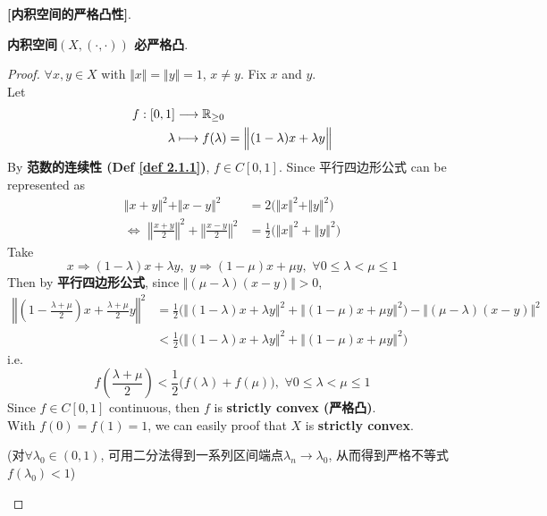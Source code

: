 	\begin{proposition}\label{prop 3.3.1}
		\textbf{[内积空间的严格凸性]}. 
		\begin{center}
			\textbf{内积空间$(X , (\cdot , \cdot))$ 必严格凸}.
		\end{center}
		
		\vspace{4em}
		
		\begin{proof}
			$\forall x , y \in X$ with $\Vert x \Vert = \Vert y \Vert = 1$, $x \neq y$. Fix $x$ and $y$. \\
			Let
			\begin{align}
				f : [0 , 1] &\longrightarrow \mathbb{R}_{\geq 0} \\
				\lambda &\longmapsto f(\lambda) = \Big\Vert (1 - \lambda) x + \lambda y \Big\Vert
			\end{align}
			By \textbf{范数的连续性 (Def \ref{def 2.1.1})}, $f \in C[0 , 1]$. Since 平行四边形公式 can be represented as
			\begin{align}
				\Vert x + y \Vert^2 + \Vert x - y \Vert^2 
				&= 2 \Big( \Vert x \Vert^2 + \Vert y \Vert^2 \Big) \\
				\Leftrightarrow \,\, 
				\left\Vert \frac{x + y}{2} \right\Vert^2 + \left\Vert \frac{x - y}{2} \right\Vert^2 
				&= \frac{1}{2} \Big( \left\Vert x \right\Vert^2 + \left\Vert y \right\Vert^2 \Big)
			\end{align}
			Take 
			\[ x \Rightarrow (1 - \lambda)x + \lambda y , \,\, y \Rightarrow (1 - \mu)x + \mu y , \,\, \forall 0 \leq \lambda < \mu \leq 1  \]
			Then by \textbf{平行四边形公式}, since $\Big\Vert (\mu - \lambda)(x - y) \Big\Vert > 0$, 
			\begin{align}
				\left\Vert \left( 1 - \frac{\lambda + \mu}{2} \right) x + \frac{\lambda + \mu}{2} y  \right\Vert^2 
				&= \frac{1}{2} \Big( \Big\Vert (1 - \lambda)x + \lambda y \Big\Vert^2 + \Big\Vert (1 - \mu)x + \mu y \Big\Vert^2 \Big) - \Big\Vert (\mu - \lambda)(x - y) \Big\Vert^2 \\
				&< \frac{1}{2} \Big( \Big\Vert (1 - \lambda)x + \lambda y \Big\Vert^2 + \Big\Vert (1 - \mu)x + \mu y \Big\Vert^2 \Big)
			\end{align}
			i.e. 
			\[ f\left( \frac{\lambda + \mu}{2} \right) < \frac{1}{2} \Big( f\left( \lambda \right) + f(\mu) \Big) , \,\, \forall 0 \leq \lambda < \mu \leq 1 \]
			Since $f \in C[0 , 1]$ continuous, then $f$ is \textbf{strictly convex (严格凸)}. \\
			With $f(0) = f(1) = 1$, we can easily proof that $X$ is \textbf{strictly convex}. 
			\begin{center}
				(对$\forall \lambda_0 \in (0 , 1)$, 可用二分法得到一系列区间端点$\lambda_n \to \lambda_0$, 从而得到严格不等式$f(\lambda_0) < 1$)
			\end{center}
		\end{proof}
	\end{proposition}

	
















	\ifx\allfiles\undefined

\fi